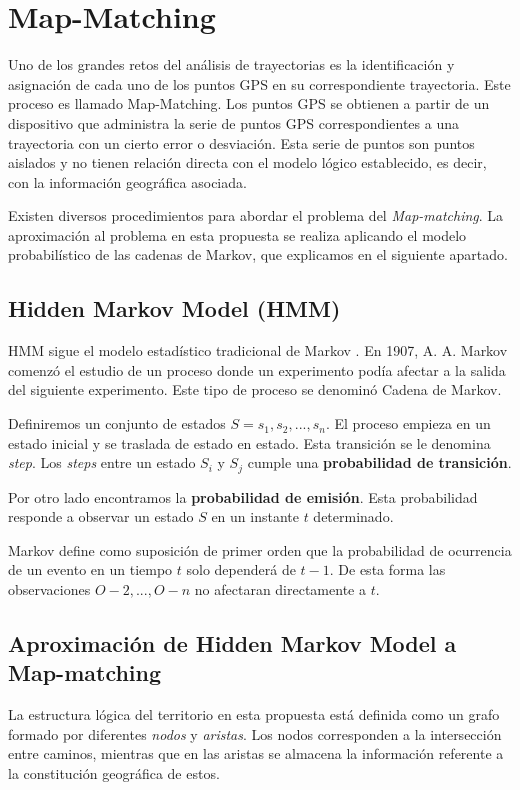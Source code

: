 \section{Map-Matching}\label{section: MapMatching}
Uno de los grandes retos del análisis de trayectorias es la identificación y asignación de cada uno de los puntos GPS en su correspondiente trayectoria. Este proceso es llamado Map-Matching. Los puntos GPS se obtienen a partir de un dispositivo que administra la serie de puntos GPS correspondientes a una trayectoria con un cierto error o desviación. Esta serie de puntos son puntos aislados y no tienen relación directa con el modelo lógico establecido, es decir, con la información geográfica asociada.

Existen diversos procedimientos para abordar el problema del \textit{Map-matching}. La 
aproximación al problema en esta propuesta se realiza aplicando el modelo probabilístico de las 
cadenas de Markov, que explicamos en el siguiente apartado.

\subsection{Hidden Markov Model (\ac{HMM})}
\ac{HMM} sigue el modelo estadístico tradicional de Markov \cite{Malvar08}. En 1907, A. A. Markov 
comenzó el estudio de un proceso donde un experimento podía afectar a la salida del siguiente 
experimento. Este tipo de proceso se denominó Cadena de Markov. 

Definiremos un conjunto de estados $ S = {s_{1}, s_{2}, . . . , s_{n}}. $ El proceso empieza en un estado inicial y se traslada de estado en estado. Esta transición se le denomina \textit{step}. Los \textit{steps} entre un estado $S_{i}$  y $S_{j}$ cumple una \textbf{probabilidad de transición}.

Por otro lado encontramos la \textbf{probabilidad de emisión}. Esta probabilidad responde a observar un estado $S$ en un instante $t$ determinado.

Markov define como suposición de primer orden que la probabilidad de ocurrencia de un evento en un tiempo $t$ solo dependerá de $t-1$. De esta forma las observaciones ${O-2,..., O-n}$ no 
afectaran directamente a $t$.

\subsection{Aproximación de Hidden Markov Model a Map-matching}
La estructura lógica del territorio en esta propuesta está definida como un grafo formado por diferentes \textit{nodos} y \textit{aristas}. Los nodos corresponden a la intersección entre caminos, mientras que en las aristas se almacena la información referente a la constitución geográfica de estos.

